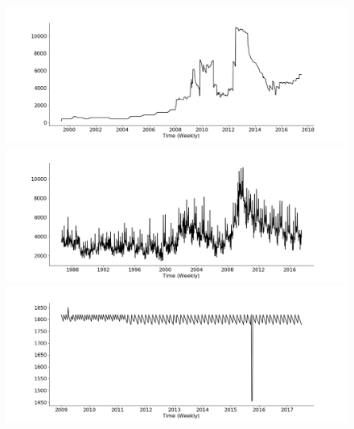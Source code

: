 \documentclass[lettersize,journal]{IEEEtran}
\begin{document}
\begin{figure}
  \includegraphics[width=1.\linewidth]{figure/W10}
  \label{fig:m4examples:sub1}
  \includegraphics[width=1.\linewidth]{figure/W20}
  \includegraphics[width=1.\linewidth]{figure/W220}

\end{figure}
\end{document}
